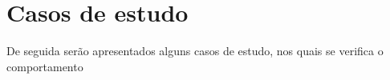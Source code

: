 \chapter[Casos de estudo]
{Casos de estudo}

De seguida serão apresentados alguns casos de estudo, nos quais se verifica o comportamento



